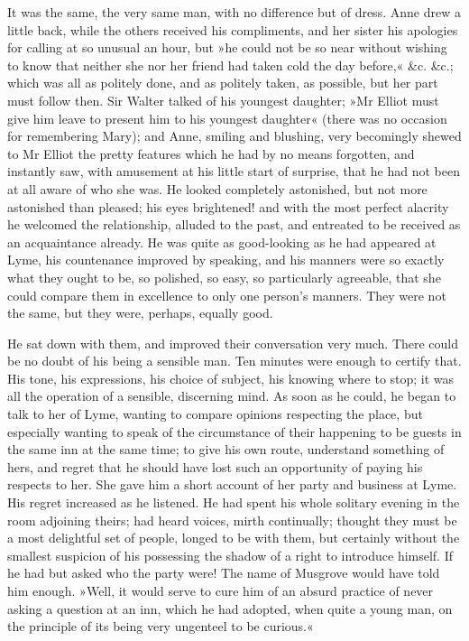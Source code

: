 It was the same, the very same man, with no difference but of dress. Anne drew a little back, while the others received his compliments, and her sister his apologies for calling at so unusual an hour, but »he could not be so near without wishing to know that neither she nor her friend had taken cold the day before,« \&c. \&c.; which was all as politely done, and as politely taken, as possible, but her part must follow then. Sir Walter talked of his youngest daughter; »Mr Elliot must give him leave to present him to his youngest daughter« (there was no occasion for remembering Mary); and Anne, smiling and blushing, very becomingly shewed to Mr Elliot the pretty features which he had by no means forgotten, and instantly saw, with amusement at his little start of surprise, that he had not been at all aware of who she was. He looked completely astonished, but not more astonished than pleased; his eyes brightened! and with the most perfect alacrity he welcomed the relationship, alluded to the past, and entreated to be received as an acquaintance already. He was quite as good-looking as he had appeared at Lyme, his countenance improved by speaking, and his manners were so exactly what they ought to be, so polished, so easy, so particularly agreeable, that she could compare them in excellence to only one person's manners. They were not the same, but they were, perhaps, equally good.

He sat down with them, and improved their conversation very much. There could be no doubt of his being a sensible man. Ten minutes were enough to certify that. His tone, his expressions, his choice of subject, his knowing where to stop; it was all the operation of a sensible, discerning mind. As soon as he could, he began to talk to her of Lyme, wanting to compare opinions respecting the place, but especially wanting to speak of the circumstance of their happening to be guests in the same inn at the same time; to give his own route, understand something of hers, and regret that he should have lost such an opportunity of paying his respects to her. She gave him a short account of her party and business at Lyme. His regret increased as he listened. He had spent his whole solitary evening in the room adjoining theirs; had heard voices, mirth continually; thought they must be a most delightful set of people, longed to be with them, but certainly without the smallest suspicion of his possessing the shadow of a right to introduce himself. If he had but asked who the party were! The name of Musgrove would have told him enough. »Well, it would serve to cure him of an absurd practice of never asking a question at an inn, which he had adopted, when quite a young man, on the principle of its being very ungenteel to be curious.«

